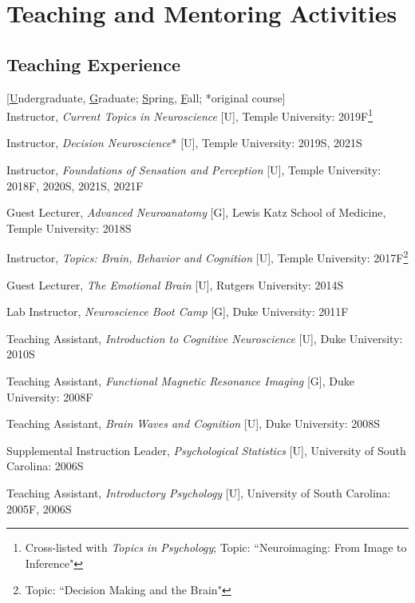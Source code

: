 \documentclass[11pt, letterpaper]{article}
\begin{document}
\vspace{.2cm}
\section*{Teaching and Mentoring Activities}
\subsection*{Teaching Experience}

[\underline{U}ndergraduate, \underline{G}raduate; \underline{S}pring, \underline{F}all; *original course] \\ [.2cm]
Instructor, \textit{Current Topics in Neuroscience} [U], Temple University: 2019F\footnote{Cross-listed with \textit{Topics in Psychology}; Topic: ``Neuroimaging: From Image to Inference"}

Instructor, \textit{Decision Neuroscience}* [U], Temple University: 2019S, 2021S

Instructor, \textit{Foundations of Sensation and Perception} [U], Temple University: 2018F, 2020S, 2021S, 2021F

Guest Lecturer, \textit{Advanced Neuroanatomy} [G], Lewis Katz School of Medicine, Temple University: 2018S

Instructor, \textit{Topics: Brain, Behavior and Cognition} [U], Temple University: 2017F\footnote{Topic: ``Decision Making and the Brain"}

Guest Lecturer, \textit{The Emotional Brain} [U], Rutgers University: 2014S

Lab Instructor, \textit{Neuroscience Boot Camp} [G], Duke University: 2011F

Teaching Assistant, \textit{Introduction to Cognitive Neuroscience} [U], Duke University: 2010S

Teaching Assistant, \textit{Functional Magnetic Resonance Imaging} [G], Duke University: 2008F

Teaching Assistant, \textit{Brain Waves and Cognition} [U], Duke University: 2008S

Supplemental Instruction Leader, \textit{Psychological Statistics} [U], University of South Carolina: 2006S

Teaching Assistant, \textit{Introductory Psychology} [U], University of South Carolina: 2005F, 2006S \\
\end{document}
